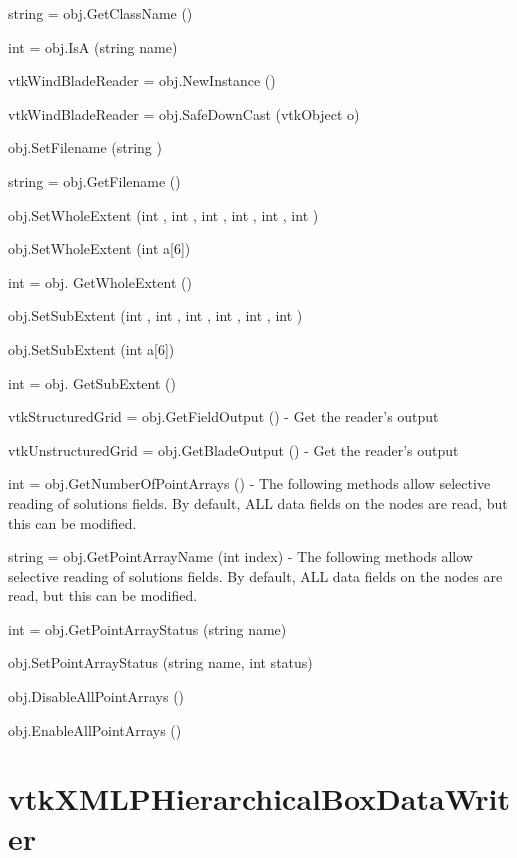 \begin{DoxyItemize}
\item {\ttfamily string = obj.\-Get\-Class\-Name ()}  
\item {\ttfamily int = obj.\-Is\-A (string name)}  
\item {\ttfamily vtk\-Wind\-Blade\-Reader = obj.\-New\-Instance ()}  
\item {\ttfamily vtk\-Wind\-Blade\-Reader = obj.\-Safe\-Down\-Cast (vtk\-Object o)}  
\item {\ttfamily obj.\-Set\-Filename (string )}  
\item {\ttfamily string = obj.\-Get\-Filename ()}  
\item {\ttfamily obj.\-Set\-Whole\-Extent (int , int , int , int , int , int )}  
\item {\ttfamily obj.\-Set\-Whole\-Extent (int a\mbox{[}6\mbox{]})}  
\item {\ttfamily int = obj. Get\-Whole\-Extent ()}  
\item {\ttfamily obj.\-Set\-Sub\-Extent (int , int , int , int , int , int )}  
\item {\ttfamily obj.\-Set\-Sub\-Extent (int a\mbox{[}6\mbox{]})}  
\item {\ttfamily int = obj. Get\-Sub\-Extent ()}  
\item {\ttfamily vtk\-Structured\-Grid = obj.\-Get\-Field\-Output ()} -\/ Get the reader's output  
\item {\ttfamily vtk\-Unstructured\-Grid = obj.\-Get\-Blade\-Output ()} -\/ Get the reader's output  
\item {\ttfamily int = obj.\-Get\-Number\-Of\-Point\-Arrays ()} -\/ The following methods allow selective reading of solutions fields. By default, A\-L\-L data fields on the nodes are read, but this can be modified.  
\item {\ttfamily string = obj.\-Get\-Point\-Array\-Name (int index)} -\/ The following methods allow selective reading of solutions fields. By default, A\-L\-L data fields on the nodes are read, but this can be modified.  
\item {\ttfamily int = obj.\-Get\-Point\-Array\-Status (string name)}  
\item {\ttfamily obj.\-Set\-Point\-Array\-Status (string name, int status)}  
\item {\ttfamily obj.\-Disable\-All\-Point\-Arrays ()}  
\item {\ttfamily obj.\-Enable\-All\-Point\-Arrays ()}  
\end{DoxyItemize}\hypertarget{vtkparallel_vtkxmlphierarchicalboxdatawriter}{}\section{vtk\-X\-M\-L\-P\-Hierarchical\-Box\-Data\-Writer}\label{vtkparallel_vtkxmlphierarchicalboxdatawriter}

